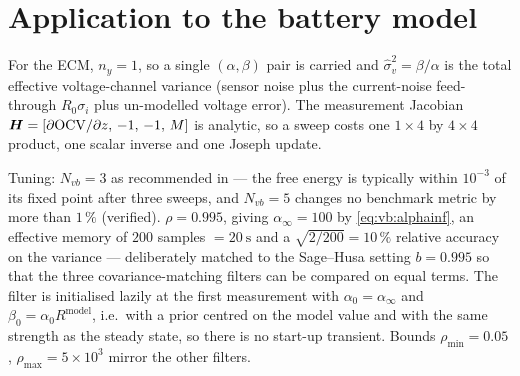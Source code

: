\section{Application to the battery model}
For the ECM, $n_y=1$, so a single $(\alpha,\beta)$ pair is carried and
$\hat{\sigma}_v^2 = \beta/\alpha$ is the total effective voltage-channel variance (sensor noise
plus the current-noise feed-through $R_0\sigma_i$ plus un-modelled voltage error).  The measurement
Jacobian $\bm{H}=[\partial\mathrm{OCV}/\partial z,\,-1,\,-1,\,M]$ is analytic, so a sweep costs one
$1\times4$ by $4\times4$ product, one scalar inverse and one Joseph update.

Tuning: $N_{vb}=3$ as recommended in \cite{sarkka2009vb} --- the free energy is typically within
$10^{-3}$ of its fixed point after three sweeps, and $N_{vb}=5$ changes no benchmark metric by more
than $1\,\%$ (verified).  $\rho = 0.995$, giving $\alpha_\infty = 100$ by \eqref{eq:vb:alphainf}, an
effective memory of $200$ samples $=\SI{20}{\second}$ and a $\sqrt{2/200}=10\,\%$ relative accuracy
on the variance --- deliberately matched to the Sage--Husa setting $b=0.995$ so that the three
covariance-matching filters can be compared on equal terms.  The filter is initialised lazily at the
first measurement with $\alpha_0=\alpha_\infty$ and $\beta_0=\alpha_0 R^{\text{model}}$, i.e.\ with a
prior centred on the model value and with the same strength as the steady state, so there is no
start-up transient.  Bounds $\rho_{\min}=0.05$, $\rho_{\max}=5\times10^3$ mirror the other filters.

